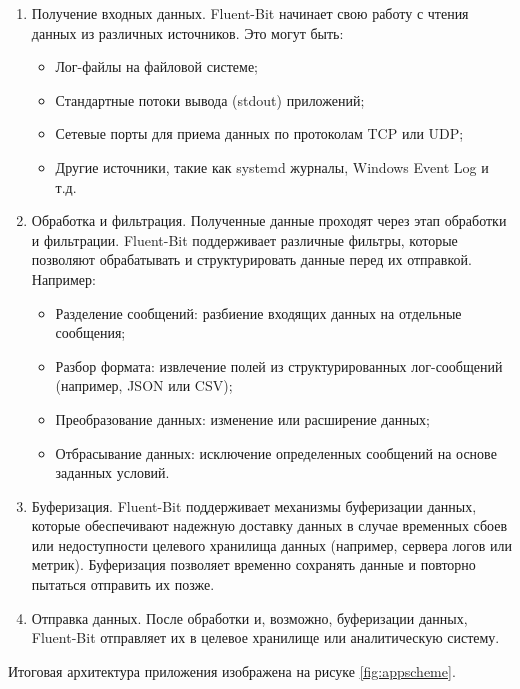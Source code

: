 \documentclass[14pt, russian]{scrartcl}
\begin{document}
\begin{enumerate}
	\item Получение входных данных. Fluent-Bit начинает свою работу с чтения данных из различных источников. Это могут быть:
	      \begin{itemize}
		      \item Лог-файлы на файловой системе;
		      \item Стандартные потоки вывода (stdout) приложений;
		      \item Сетевые порты для приема данных по протоколам TCP или UDP;
		      \item Другие источники, такие как systemd журналы, Windows Event Log и т.д.
	      \end{itemize}

	\item Обработка и фильтрация. Полученные данные проходят через этап обработки и фильтрации. Fluent-Bit поддерживает различные фильтры, которые позволяют обрабатывать и структурировать данные перед их отправкой. Например:
	      \begin{itemize}
		      \item Разделение сообщений: разбиение входящих данных на отдельные сообщения;
		      \item Разбор формата: извлечение полей из структурированных лог-сообщений (например, JSON или CSV);
		      \item Преобразование данных: изменение или расширение данных;
		      \item Отбрасывание данных: исключение определенных сообщений на основе заданных условий.
	      \end{itemize}

	\item Буферизация. Fluent-Bit поддерживает механизмы буферизации данных, которые обеспечивают надежную доставку данных в случае временных сбоев или недоступности целевого хранилища данных (например, сервера логов или метрик). Буферизация позволяет временно сохранять данные и повторно пытаться отправить их позже.

	\item Отправка данных.
	      После обработки и, возможно, буферизации данных, Fluent-Bit отправляет их в целевое хранилище или аналитическую систему.

\end{enumerate}



Итоговая архитектура приложения изображена на рисуке \ref{fig:appscheme}.
\end{document}
